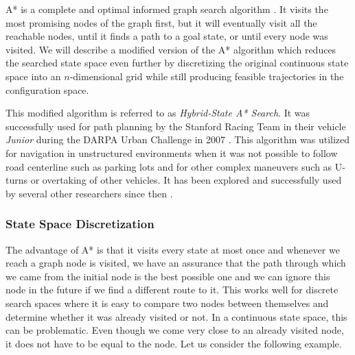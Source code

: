 A* is a complete and optimal informed graph search algorithm \cite{Nilsson_astar}. It visits the most promising nodes of the graph first, but it will eventually visit all the reachable nodes, until it finds a path to a goal state, or until every node was visited. We will describe a modified version of the A* algorithm which reduces the searched state space even further by discretizing the original continuous state space into an $n$-dimensional grid while still producing feasible trajectories in the configuration space.

This modified algorithm is referred to as \textit{Hybrid-State A* Search}. It was successfully used for path planning by the Stanford Racing Team in their vehicle \textit{Junior} during the DARPA Urban Challenge in 2007 \cite{dolgov08gppSTAIR}. This algorithm was utilized for navigation in unstructured environments when it was not possible to follow road centerline such as parking lots and for other complex maneuvers such as U-turns or overtaking of other vehicles. It has been explored and successfully used by several other researchers since then \cite{Hybrid_astar}.

\subsubsection{State Space Discretization}

The advantage of A* is that it visits every state at most once and whenever we reach a graph node is visited, we have an assurance that the path through which we came from the initial node is the best possible one and we can ignore this node in the future if we find a different route to it. This works well for discrete search spaces where it is easy to compare two nodes between themselves and determine whether it was already visited or not. In a continuous state space, this can be problematic. Even though we come very close to an already visited node, it does not have to be equal to the node. Let us consider the following example.

